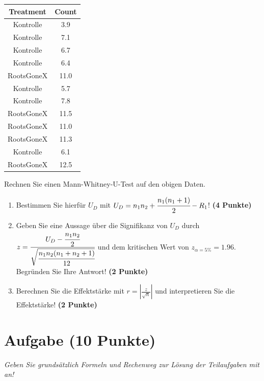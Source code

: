 \documentclass[a4paper, 9pt]{scrartcl}\usepackage[]{graphicx}\usepackage[]{xcolor}
\newenvironment{knitrout}{}{} %
\begin{document}
\begin{knitrout}
\color{fgcolor}\begin{table}[!h]
\centering
\begin{tabular}{cc}
\toprule
Treatment & Count\\
\midrule
Kontrolle & 3.9\\
Kontrolle & 7.1\\
Kontrolle & 6.7\\
Kontrolle & 6.4\\
RootsGoneX & 11.0\\
\addlinespace
Kontrolle & 5.7\\
Kontrolle & 7.8\\
RootsGoneX & 11.5\\
RootsGoneX & 11.0\\
RootsGoneX & 11.3\\
\addlinespace
Kontrolle & 6.1\\
RootsGoneX & 12.5\\
\bottomrule
\end{tabular}
\end{table}

\end{knitrout}

Rechnen Sie einen Mann-Whitney-U-Test auf den obigen Daten.

\begin{enumerate}
\item Bestimmen Sie hierf{\"u}r $U_D$ mit $U_D = n_1n_2 +
  \cfrac{n_1(n_1+1)}{2}-R_1$! \textbf{(4 Punkte)} 
\item Geben Sie eine Aussage {\"u}ber die Signifikanz von $U_D$ durch
  $z = \cfrac{U_D -
    \cfrac{n_1n_2}{2}}{\sqrt{\cfrac{n_1n_2(n_1+n_2+1)}{12}}}$ und dem
  kritischen Wert von $z_{\alpha = 5\%} = 1.96$. Begr{\"u}nden Sie Ihre
  Antwort! \textbf{(2 Punkte)}
\item Berechnen Sie die Effektst{\"a}rke mit $r = |\frac{z}{\sqrt{n}}| $ und
  interpretieren Sie die Effektst{\"a}rke! \textbf{(2 Punkte)} 
\end{enumerate} 
\clearpage

\section{Aufgabe \hfill (10 Punkte)}

\textit{Geben Sie grunds{\"a}tzlich Formeln und Rechenweg zur L{\"o}sung der
  Teilaufgaben mit an!} \\[1Ex]
\end{document}
